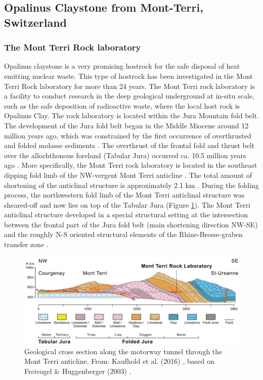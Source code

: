 \subsection{Opalinus Claystone from Mont-Terri, Switzerland}
\label{subsec:clay}

\subsubsection{The Mont Terri Rock laboratory}\label{sec:mont_terri}

Opalinus claystone is a very promising hostrock for the safe disposal of heat emitting nuclear waste. This type of hostrock has been investigated in the Mont Terri Rock laboratory for more than 24 years. The Mont Terri rock laboratory is a facility to conduct research in the deep geological underground at in-situ scale, such as the safe deposition of radioactive waste, where the local host rock is Opalinus Clay. The rock laboratory is located within the Jura Mountain fold belt. The development of the Jura fold belt began in the Middle Miocene around 12 million years ago, which was constrained by the first occurrence of overthrusted and folded molasse sediments \cite{bolliger1993}. The overthrust of the frontal fold and thrust belt over the allochthonous foreland (Tabular Jura) occurred ca. 10.5 million years ago \cite{becker2000}. More specifically, the Mont Terri rock laboratory is located in the southeast dipping fold limb of the NW-vergent Mont Terri anticline \cite{nussbaum2011}. The total amount of shortening of the anticlinal structure is approximately 2.1 km \cite{freivogel2003}. During the folding process, the northwestern fold limb of the Mont Terri anticlinal structure was sheared-off and now lies on top of the Tabular Jura (Figure \ref{fig:bgr_mt_sideview}). The Mont Terri anticlinal structure developed in a special structural setting at the intersection between the frontal part of the Jura fold belt (main shortening direction NW-SE) and the roughly N-S oriented structural elements of the Rhine-Bresse-graben transfer zone \cite{nussbaum2011}.

\begin{figure}[!ht]
\centering
\includegraphics[width=1\textwidth]{./figures/bgr_mont_terri_side_view.png}
\caption{Geological cross section along the motorway tunnel through the Mont Terri anticline. From: Kaufhold et al. (2016) \cite{kaufhold2016}, based on Freivogel \& Huggenberger (2003) \cite{freivogel2003}.}
\label{fig:bgr_mt_sideview}
\end{figure}

